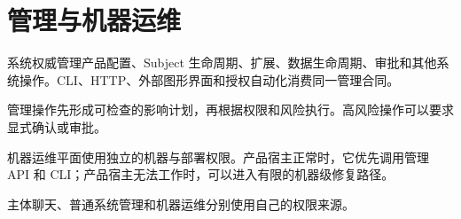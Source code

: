 \chapter{管理与机器运维}

系统权威管理产品配置、Subject 生命周期、扩展、数据生命周期、审批和其他系统操作。CLI、HTTP、外部图形界面和授权自动化消费同一管理合同。

管理操作先形成可检查的影响计划，再根据权限和风险执行。高风险操作可以要求显式确认或审批。

机器运维平面使用独立的机器与部署权限。产品宿主正常时，它优先调用管理 API 和 CLI；产品宿主无法工作时，可以进入有限的机器级修复路径。

主体聊天、普通系统管理和机器运维分别使用自己的权限来源。
